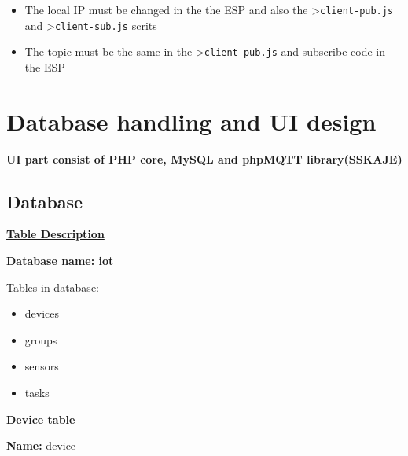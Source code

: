 \documentclass[16pt]{article}
\begin{document}
\begin{itemize}

\item
  The local IP must be changed in the the ESP and also the
  \textgreater{}\texttt{client-pub.js} and
  \textgreater{}\texttt{client-sub.js} scrits
\item
  The topic must be the same in the \textgreater{}\texttt{client-pub.js}
  and subscribe code in the ESP
\end{itemize}

\vspace{0.5cm}



\vspace{12cm}

\section{Database handling and UI design}
{{\textbf{UI part consist of PHP core, MySQL and phpMQTT library(SSKAJE) }}}
\subsection{Database}
\vspace{0.3cm}
{\Large{\underline{\textbf{Table Description}}}}
\vspace{0.2cm}

\textbf{Database name: iot}

Tables in database: 

\begin{itemize}

\item devices
\item groups 
\item sensors
\item tasks  

\end{itemize}

\textbf{Device table}

\textbf{Name:} device
\end{document}
